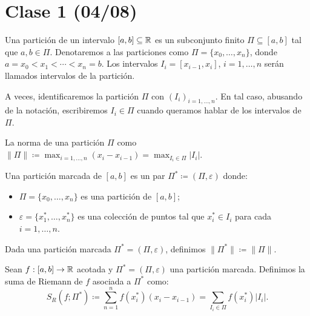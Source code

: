 
	\section{Clase 1 (04/08)}

	\begin{definition}
		Una partición de un intervalo $[a,b]\subseteq\mathbb{R}$ es un subconjunto finito $\Pi\subseteq[a,b]$ tal que $a,b\in\Pi$. Denotaremos a las particiones como $\Pi=\{x_0,\dots,x_n\}$, donde $a=x_0<x_1<\cdots<x_n=b$. Los intervalos $I_i=[x_{i-1},x_i]$, $i=1,\dots,n$ serán llamados intervalos de la partición.
	\end{definition}

	\begin{remark}
		A veces, identificaremos la partición $\Pi$ con $(I_i)_{i=1,\dots,n}$. En tal caso, abusando de la notación, escribiremos $I_i\in\Pi$ cuando queramos hablar de los intervalos de $\Pi$.
	\end{remark}

	\begin{definition}
		La norma de una partición $\Pi$ como $\|\Pi\|\coloneqq \max_{i=1,\dots,n}(x_i-x_{i-1})=\max_{I_i\in\Pi}|I_i|$.
	\end{definition}

	\begin{definition}
		Una partición marcada de $[a,b]$ es un par $\Pi^*\coloneqq(\Pi,\varepsilon)$ donde:
		\begin{itemize}
			\item $\Pi = \{x_0,\dots,x_n\}$ es una partición de $[a,b]$;
			\item $\varepsilon = \{x_1^*,\dots,x_n^*\}$ es una colección de puntos tal que $x_i^*\in I_i$ para cada $i=1,\dots,n$.
		\end{itemize}
	\end{definition}

	\begin{remark}
		Dada una partición marcada $\Pi^*=(\Pi,\varepsilon)$, definimos $\|\Pi^*\|\coloneqq \|\Pi\|$.
	\end{remark}

	\begin{definition}
		Sean $f:[a,b]\to\mathbb{R}$ acotada y $\Pi^*=(\Pi,\varepsilon)$ una partición marcada. Definimos la suma de Riemann de $f$ asociada a $\Pi^*$ como:
		\[
		S_R(f;\Pi^*)\coloneqq \sum_{n=1}^{n} f(x_i^*)(x_i-x_{i-1})= \sum_{I_i\in\Pi}^{} f(x_i^*)|I_i|.
		\]
	\end{definition}

